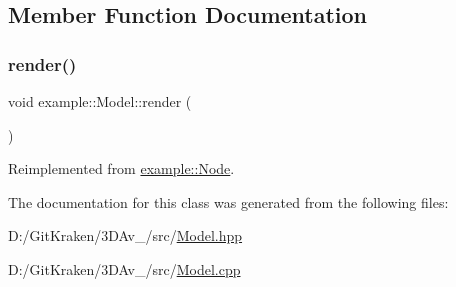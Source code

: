 \subsection{Member Function Documentation}
\mbox{\label{classexample_1_1_model_ade64225bbb0381bbd5a8dddeac81d983}} 
\subsubsection{\texorpdfstring{render()}{render()}}
{\footnotesize\ttfamily void example\+::\+Model\+::render (\begin{DoxyParamCaption}{ }\end{DoxyParamCaption})\hspace{0.3cm}{\ttfamily [virtual]}}



Reimplemented from \mbox{\hyperlink{classexample_1_1_node_a6e9c30ac62693f7fa0a4080202df45df}{example\+::\+Node}}.



The documentation for this class was generated from the following files\+:\begin{DoxyCompactItemize}
\item 
D\+:/\+Git\+Kraken/3\+D\+Av\+\_/src/\mbox{\hyperlink{_model_8hpp}{Model.\+hpp}}\item 
D\+:/\+Git\+Kraken/3\+D\+Av\+\_/src/\mbox{\hyperlink{_model_8cpp}{Model.\+cpp}}\end{DoxyCompactItemize}
